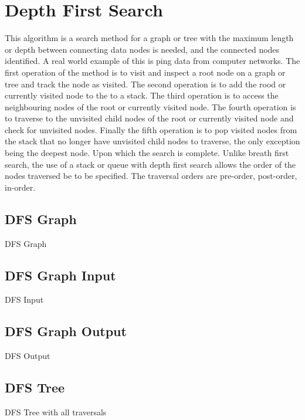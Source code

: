 \section{Depth First Search}
This algorithm is a search method for a graph or tree with the maximum length or depth between connecting data nodes is needed, and the connected nodes identified. 
A real world example of this is ping data from computer networks. 
The first operation of the method is to visit and inspect a root node on a graph or tree and track the node as visited.
The second operation is to add the rood or currently visited node to the to a stack.
The third operation is to access the neighbouring nodes of the root or currently visited node.
The fourth operation is to traverse to the unvisited child nodes of the root or currently visited node and check for unvisited nodes. 
Finally the fifth operation is to pop visited nodes from the stack that no longer have unvisited child nodes to traverse, the only exception being the deepest node.
Upon which the search is complete.
Unlike breath first search, the use of a stack or queue with depth first search allows the order of the nodes traversed be to be specified.
The traversal orders are pre-order, post-order, in-order.    
 
\subsection{DFS Graph}
DFS Graph 

\subsection{DFS Graph Input}
DFS Input

\subsection{DFS Graph Output}
DFS Output

\subsection{DFS Tree}
DFS Tree with all traversals 

